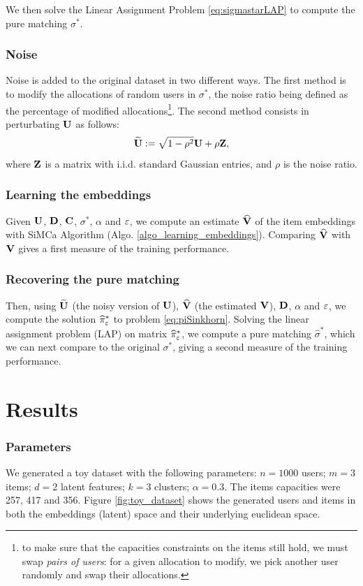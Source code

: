 We then solve the Linear Assignment Problem \eqref{eq:sigmastarLAP} to compute the pure matching $\sigma^*$.

\subsubsection*{Noise}
Noise is added to the original dataset in two different ways. The first method is to modify the allocations of random users in $\sigma^*$, the noise ratio being defined as the percentage of modified allocations\footnote{to make sure that the capacities constraints on the items still hold, we must swap \emph{pairs of users}: for a given allocation to modify, we pick another user randomly and swap their allocations.}. The second method consists in perturbating $\mathbf{U}$ as follows:
\begin{equation*}
    \widetilde{\mathbf{U}} := \sqrt{1-\rho^2} \mathbf{U} + \rho \mathbf{Z},
\end{equation*} where $\mathbf{Z}$ is a matrix with i.i.d. standard Gaussian entries, and $\rho$ is the noise ratio.

\subsubsection*{Learning the embeddings}
Given $\mathbf{U}$, $\mathbf{D}$, $\mathbf{C}$, $\sigma^*$, $\alpha$ and $\varepsilon$, we compute an estimate $\widehat{\mathbf{V}}$ of the item embeddings with SiMCa Algorithm (Algo. \ref{algo_learning_embeddings}). Comparing $\widehat{\mathbf{V}}$ with $\mathbf{V}$ gives a first measure of the training performance.

\subsubsection*{Recovering the pure matching}
Then, using $\widetilde{\mathbf{U}}$ (the noisy version of $\mathbf{U}$), $\widehat{\mathbf{V}}$ (the estimated $\mathbf{V}$), $\mathbf{D}$, $\alpha$ and $\varepsilon$, we compute the solution $\widehat{\pi}^*_{\varepsilon}$ to problem \eqref{eq:piSinkhorn}. Solving the linear assignment problem (LAP) on matrix $\widehat{\pi}^*_{\varepsilon}$, we compute a pure matching $\widehat{\sigma}^*$, which we can next compare to the original ${\sigma}^*$, giving a second measure of the training performance.

\section{Results}

\subsubsection*{Parameters}
We generated a toy dataset with the following parameters: $n=1000$ users; $m=3$ items; $d=2$ latent features; $k=3$ clusters; $\alpha=0.3$. The items capacities were 257, 417 and 356. Figure \ref{fig:toy_dataset} shows the generated users and items in both the embeddings (latent) space and their underlying euclidean space.

